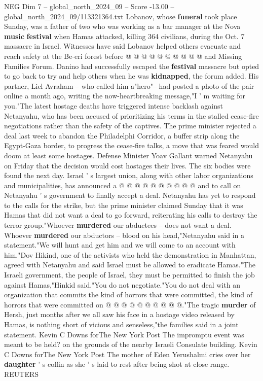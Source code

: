 \begin{textsample}{NEG Dim 7 – global\_north\_2024\_09 – Score -13.00 – global\_north\_2024\_09/113321364.txt}
Lobanov, whose \textbf{funeral} took place Sunday, was a father of two who was working as a bar manager at the Nova \textbf{music} \textbf{festival} when Hamas attacked, killing 364 civilians, during the Oct. 7 massacre in Israel.
Witnesses have said Lobanov helped others evacuate and reach safety at the Be-eri forest before @ @ @ @ @ @ @ @ @ @ and Missing Families Forum.
Danino had successfully escaped the \textbf{festival} massacre but opted to go back to try and help others when he was \textbf{kidnapped}, the forum added.
His partner, Liel Avraham -- who called him a"hero"-- had posted a photo of the pair online a month ago, writing the now-heartbreaking message,"I ' m waiting for you."The latest hostage deaths have triggered intense backlash against Netanyahu, who has been accused of prioritizing his terms in the stalled cease-fire negotiations rather than the safety of the captives.
The prime minister rejected a deal last week to abandon the Philadelphi Corridor, a buffer strip along the Egypt-Gaza border, to progress the cease-fire talks, a move that was feared would doom at least some hostages.
Defense Minister Yoav Gallant warned Netanyahu on Friday that the decision would cost hostages their lives.
The six bodies were found the next day.
Israel ' s largest union, along with other labor organizations and municipalities, has announced a @ @ @ @ @ @ @ @ @ @ and to call on Netanyahu ' s government to finally accept a deal.
Netanyahu has yet to respond to the calls for the strike, but the prime minister claimed Sunday that it was Hamas that did not want a deal to go forward, reiterating his calls to destroy the terror group."Whoever \textbf{murdered} our abductees -- does not want a deal.
Whoever \textbf{murdered} our abductors -- blood on his head,"Netanyahu said in a statement."We will hunt and get him and we will come to an account with him."Dov Hikind, one of the activists who held the demonstration in Manhattan, agreed with Netanyahu and said Israel must be allowed to eradicate Hamas."The Israeli government, the people of Israel, they must be permitted to finish the job against Hamas,"Hinkid said."You do not negotiate."You do not deal with an organization that commits the kind of horrors that were committed, the kind of horrors that were committed on @ @ @ @ @ @ @ @ @ @."The tragic \textbf{murder} of Hersh, just months after we all saw his face in a hostage video released by Hamas, is nothing short of vicious and senseless,"the families said in a joint statement.
Kevin C Downs forThe New York Post The impromptu event was meant to be held? on the grounds of the nearby Israeli Consulate building.
Kevin C Downs forThe New York Post The mother of Eden Yerushalmi cries over her \textbf{daughter} ' s coffin as she ' s laid to rest after being shot at close range.
REUTERS

\end{textsample}
